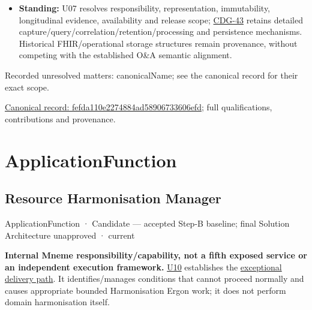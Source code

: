 \begin{itemize}


\item \textbf{Standing:} U07 resolves responsibility, representation, immutability,
  longitudinal evidence, availability and release scope; \href{\detokenize{../../../../../docs/markdown/05-information-systems-architecture/gaps.md#kleio-detailed-contracts}}{CDG-43}
  retains detailed capture/query/correlation/retention/processing and persistence
  mechanisms. Historical FHIR/operational storage structures remain provenance,
  without competing with the established O\&A semantic alignment.

\end{itemize}

{\small Recorded unresolved matters: canonicalName; see the canonical record for their exact scope.}\par
{\footnotesize \href{../../../../continuum/application/application-component/fefda110e2274884ad58906733606efd.md}{Canonical record: fefda110e2274884ad58906733606efd}; full qualifications, contributions and provenance.}\par
\section{ApplicationFunction}

\subsection{Resource Harmonisation Manager}

\label{element:a6580e0b9f0f40c9a33d731d20110057}
{\small ApplicationFunction · Candidate — accepted Step-B baseline; final Solution Architecture unapproved · current}\par

\textbf{Internal Mneme responsibility/capability, not a fifth exposed service or an
independent execution framework.} \href{\detokenize{../../../../../docs/markdown/05-information-systems-architecture/sources.md#u10}}{U10} establishes the
\hyperref[element:a6580e0b9f0f40c9a33d731d20110057]{exceptional delivery path}.
It identifies/manages conditions that cannot proceed normally and causes appropriate
bounded Harmonisation Ergon work; it does not perform domain harmonisation itself.



